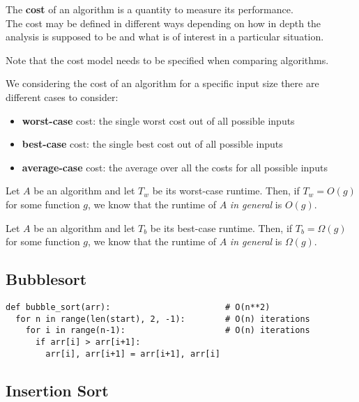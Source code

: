 \documentclass{article}
\begin{document}
\begin{definition}
	The \textbf{cost} of an algorithm is a quantity to measure its performance.\\
	The cost may be defined in different ways depending on
	how in depth the analysis is supposed to be and what
	is of interest in a particular situation.
\end{definition}
Note that the cost model needs to be specified when comparing algorithms.
\begin{definition}
	We considering the cost of an algorithm for a specific input size there are different cases to consider:
	\begin{itemize}
		\item \textbf{worst-case} cost: the single worst cost out of all possible inputs
		\item \textbf{best-case} cost: the single best cost out of all possible inputs
		\item \textbf{average-case} cost: the average over all the costs for all possible inputs
	\end{itemize}
\end{definition}
\begin{theorem}
	Let $A$ be an algorithm and let $T_w$ be its worst-case runtime. Then, if $T_w=O(g)$ for some function $g$,
	we know that the runtime of $A$ \emph{in general} is $O(g)$.
\end{theorem}
\begin{theorem}
	Let $A$ be an algorithm and let $T_b$ be its best-case runtime. Then, if $T_b=\Omega(g)$ for some function $g$,
	we know that the runtime of $A$ \emph{in general} is $\Omega (g)$.
\end{theorem}


\subsection{Bubblesort}

\begin{verbatim}
def bubble_sort(arr):                       # O(n**2)
  for n in range(len(start), 2, -1):        # O(n) iterations 
    for i in range(n-1):                    # O(n) iterations
      if arr[i] > arr[i+1]:
        arr[i], arr[i+1] = arr[i+1], arr[i]
\end{verbatim}


\subsection{Insertion Sort}
\end{document}
